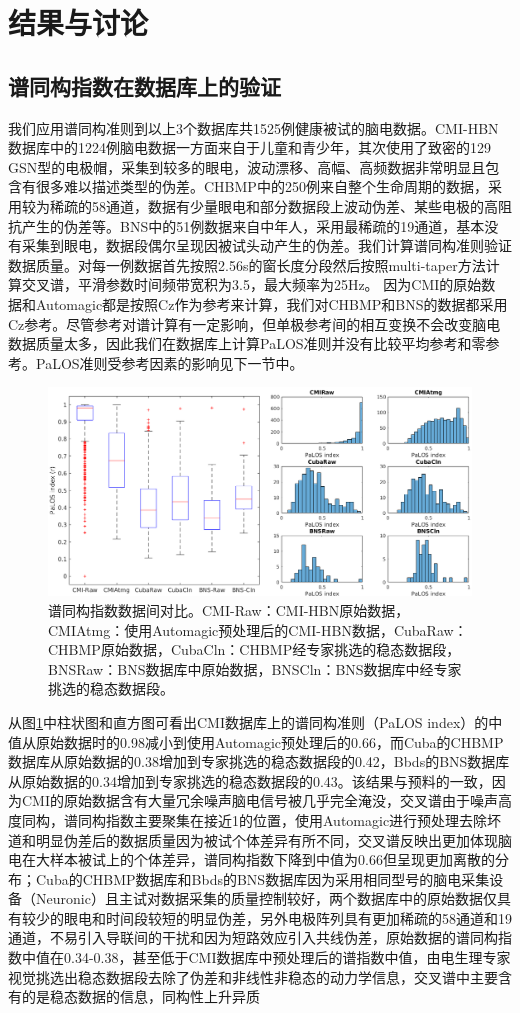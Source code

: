 \section{结果与讨论}
\subsection{谱同构指数在数据库上的验证}
我们应用谱同构准则到以上3个数据库共1525例健康被试的脑电数据。CMI-HBN数据库中的1224例脑电数据一方面来自于儿童和青少年，其次使用了致密的129 GSN型的电极帽，采集到较多的眼电，波动漂移、高幅、高频数据非常明显且包含有很多难以描述类型的伪差。CHBMP中的250例来自整个生命周期的数据，采用较为稀疏的58通道，数据有少量眼电和部分数据段上波动伪差、某些电极的高阻抗产生的伪差等。BNS中的51例数据来自中年人，采用最稀疏的19通道，基本没有采集到眼电，数据段偶尔呈现因被试头动产生的伪差。我们计算谱同构准则验证数据质量。对每一例数据首先按照2.56s的窗长度分段然后按照multi-taper方法计算交叉谱，平滑参数时间频带宽积为3.5，最大频率为25Hz。 因为CMI的原始数
据和Automagic都是按照Cz作为参考来计算，我们对CHBMP和BNS的数据都采用Cz参考。尽管参考对谱计算有一定影响，但单极参考间的相互变换不会改变脑电数据质量太多，因此我们在数据库上计算PaLOS准则并没有比较平均参考和零参考。PaLOS准则受参考因素的影响见下一节中。
\begin{figure}[!h]
	\includegraphics[width=15cm]{pic/palos/comparison.png}
	\caption{谱同构指数数据间对比。CMI-Raw：CMI-HBN原始数据，CMIAtmg：使用Automagic预处理后的CMI-HBN数据，CubaRaw：CHBMP原始数据，CubaCln：CHBMP经专家挑选的稳态数据段，BNSRaw：BNS数据库中原始数据，BNSCln：BNS数据库中经专家挑选的稳态数据段。}
	\label{5:comp}
\end{figure}
从图\ref{5:comp}中柱状图和直方图可看出CMI数据库上的谱同构准则（PaLOS index）的中值从原始数据时的0.98减小到使用Automagic预处理后的0.66，而Cuba的CHBMP数据库从原始数据的0.38增加到专家挑选的稳态数据段的0.42，Bbds的BNS数据库从原始数据的0.34增加到专家挑选的稳态数据段的0.43。该结果与预料的一致，因为CMI的原始数据含有大量冗余噪声脑电信号被几乎完全淹没，交叉谱由于噪声高度同构，谱同构指数主要聚集在接近1的位置，使用Automagic进行预处理去除坏道和明显伪差后的数据质量因为被试个体差异有所不同，交叉谱反映出更加体现脑电在大样本被试上的个体差异，谱同构指数下降到中值为0.66但呈现更加离散的分布；Cuba的CHBMP数据库和Bbds的BNS数据库因为采用相同型号的脑电采集设备（Neuronic）且主试对数据采集的质量控制较好，两个数据库中的原始数据仅具有较少的眼电和时间段较短的明显伪差，另外电极阵列具有更加稀疏的58通道和19通道，不易引入导联间的干扰和因为短路效应引入共线伪差，原始数据的谱同构指数中值在0.34-0.38，甚至低于CMI数据库中预处理后的谱指数中值，由电生理专家视觉挑选出稳态数据段去除了伪差和非线性非稳态的动力学信息，交叉谱中主要含有的是稳态数据的信息，同构性上升异质

